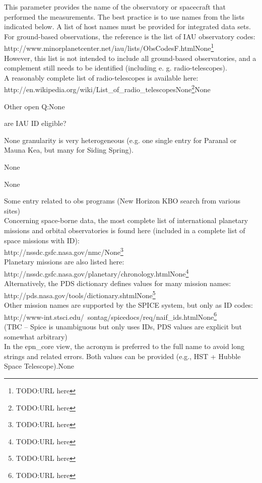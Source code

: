\documentclass[11pt,a4paper]{ivoa}
\begin{document}
This parameter provides the name of the observatory or spacecraft that performed the measurements. The best practice is to use names from the lists indicated below. A list of host names must be provided for integrated data sets. \\
 For ground-based observations, the reference is the list of IAU observatory codes: http://www.minorplanetcenter.net/iau/lists/ObsCodesF.htmlNone\footnote{TODO:URL here}\\
 However, this list is not intended to include all ground-based observatories, and a complement still needs to be identified (including e. g. radio-telescopes).\\
 A reasonably complete list of radio-telescopes is available here: \\
 http://en.wikipedia.org/wiki/List_of_radio_telescopesNone\footnote{TODO:URL here}None

Other open Q:None

are IAU ID eligible?\item None
granularity is very heterogeneous (e.g. one single entry for Paranal or Mauna Kea, but many for Siding Spring).\item None
\begin{itemize}None\end{itemize}
Some entry related to obs programs (New Horizon KBO search from various sites) \\
 Concerning space-borne data, the most complete list of international planetary missions and orbital observatories is found here (included in a complete list of space missions with ID):\\
 http://nssdc.gsfc.nasa.gov/nmc/None\footnote{TODO:URL here}\\
 Planetary missions are also listed here:\\
 http://nssdc.gsfc.nasa.gov/planetary/chronology.htmlNone\footnote{TODO:URL here} \\
 Alternatively, the PDS dictionary defines values for many mission names:\\
 http://pds.nasa.gov/tools/dictionary.shtmlNone\footnote{TODO:URL here}\\
 Other mission names are supported by the SPICE system, but only as ID codes:\\
 http://www-int.stsci.edu/~sontag/spicedocs/req/naif_ids.htmlNone\footnote{TODO:URL here}\\
 (TBC – Spice is unambiguous but only uses IDs, PDS values are explicit but somewhat arbitrary)\\
 In the epn_core view, the acronym is preferred to the full name to avoid long strings and related errors. Both values can be provided (e.g., HST + Hubble Space Telescope).None
\end{document}
